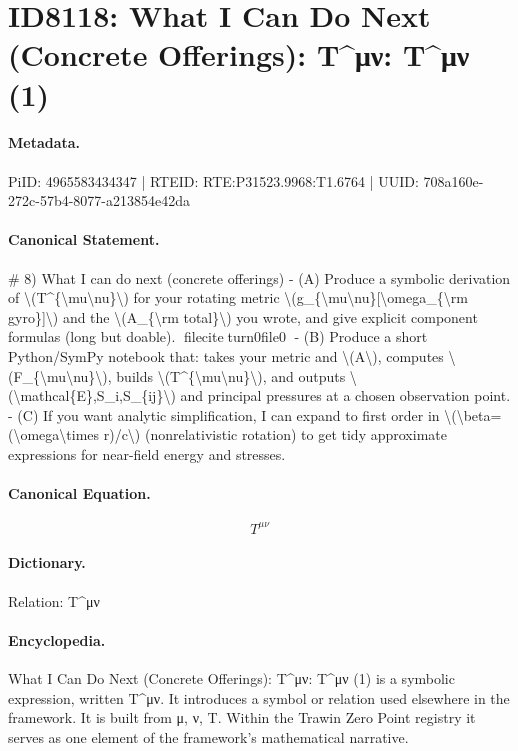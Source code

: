 \section*{ID8118: What I Can Do Next (Concrete Offerings): T\textasciicircum{}μν: T\textasciicircum{}μν (1)}
\paragraph{Metadata.}
PiID: 4965583434347 | RTEID: RTE:P31523.9968:T1.6764 | UUID: 708a160e-272c-57b4-8077-a213854e42da

\paragraph{Canonical Statement.}
\# 8) What I can do next (concrete offerings) - (A) Produce a symbolic derivation of \textbackslash{}(T\textasciicircum{}\{\textbackslash{}mu\textbackslash{}nu\}\textbackslash{}) for your rotating metric \textbackslash{}(g\_\{\textbackslash{}mu\textbackslash{}nu\}[\textbackslash{}omega\_\{\textbackslash{}rm gyro\}]\textbackslash{}) and the \textbackslash{}(A\_\{\textbackslash{}rm total\}\textbackslash{}) you wrote, and give explicit component formulas (long but doable). fileciteturn0file0 - (B) Produce a short Python/SymPy notebook that: takes your metric and \textbackslash{}(A\textbackslash{}), computes \textbackslash{}(F\_\{\textbackslash{}mu\textbackslash{}nu\}\textbackslash{}), builds \textbackslash{}(T\textasciicircum{}\{\textbackslash{}mu\textbackslash{}nu\}\textbackslash{}), and outputs \textbackslash{}(\textbackslash{}mathcal\{E\},S\_i,S\_\{ij\}\textbackslash{}) and principal pressures at a chosen observation point. - (C) If you want analytic simplification, I can expand to first order in \textbackslash{}(\textbackslash{}beta=(\textbackslash{}omega\textbackslash{}times r)/c\textbackslash{}) (nonrelativistic rotation) to get tidy approximate expressions for near-field energy and stresses.

\paragraph{Canonical Equation.}
\[
T^{\mu\nu}
\]

\paragraph{Dictionary.}
Relation: T\textasciicircum{}μν

\paragraph{Encyclopedia.}
What I Can Do Next (Concrete Offerings): T\textasciicircum{}μν: T\textasciicircum{}μν (1) is a symbolic expression, written T\textasciicircum{}μν. It introduces a symbol or relation used elsewhere in the framework. It is built from μ, ν, T. Within the Trawin Zero Point registry it serves as one element of the framework's mathematical narrative.
